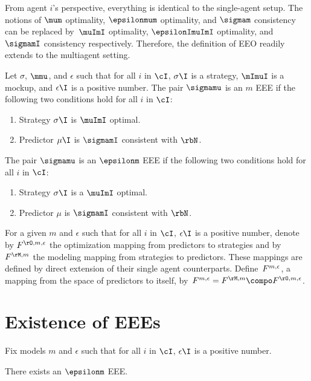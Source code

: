From agent \(i\)'s perspective, everything is identical to the single-agent setup.
The notions of \(\mum\) optimality, \(\epsilonmum\) optimality, and \(\sigmam\) consistency can be replaced by~\(\muImI\) optimality, \(\epsilonImuImI\) optimality, and \(\sigmamI\) consistency respectively.
Therefore, the definition of EEO readily extends to the multiagent setting.
\begin{definition}
Let \(\sigma\), \(\mmu\), and \(\epsilon\) such that for all \(i\) in \(\cI\), \(\sigma\I\) is a strategy, \(\mImuI\) is a mockup, and \(\epsilon\I\) is a positive number.
The pair \(\sigmamu\) is an \(m\) EEE if the following two conditions hold for all \(i\) in \(\cI\):
\begin{enumerate}
\item Strategy \(\sigma\I\) is \(\muImI\) optimal.
\item Predictor \(\mu\I\) is \(\sigmamI\) consistent with \(\rbN\).
\end{enumerate}
The pair \(\sigmamu\) is an \(\epsilonm\) EEE if the following two conditions hold for all \(i\) in \(\cI\):
\begin{enumerate}
\item Strategy \(\sigma\I\) is a \(\muImI\) optimal.
\item Predictor \(\mu\) is \(\sigmamI\) consistent with \(\rbN\).
\end{enumerate}
\end{definition}

For a given \(m\) and \(\epsilon\) such that for all \(i\) in \(\cI\), \(\epsilon\I\) is a positive number, denote by \(\FO\) the optimization mapping from predictors to strategies and by \(\FM\) the modeling mapping from strategies to  predictors.
These mappings are defined by direct extension of their single agent counterparts.
Define~\(F^{m, \epsilon}\), a mapping from the space of predictors to itself, by~\(\FF = \FM \compo \FO\).


\section{Existence of EEEs}
\label{sec:existence_of_eees}


Fix models \(m\) and \(\epsilon\) such that for all \(i\) in \(\cI\), \(\epsilon\I\) is a positive number.

\begin{theorem}
\label{res:mme_existence}
There exists an \(\epsilonm\) EEE.
\end{theorem}

